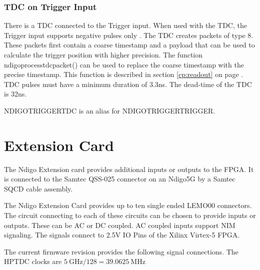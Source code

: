\subsubsection{TDC on Trigger Input}
%
There is a TDC connected to the Trigger input. When used with the TDC, the Trigger input supports negative pulses only . The TDC creates packets of type 8. These packets first contain a coarse timestamp and a payload that can be used to calculate the trigger position with higher precision. The function \textsf{ndigo\tu process\tu tdc\tu packet()} can be used to replace the coarse timestamp with the precise timestamp. This function is described in section \ref{cp:readout} on page \pageref{cp:readout}.
TDC pulses must have a minimum duration of 3.3ns. The dead-time of the TDC is 32ns.

\textsf{NDIGO\tu TRIGGER\tu TDC} is an alias for \textsf{NDIGO\tu TRIGGER\tu TRIGGER}.
%
%
%
%
%
\section{Extension Card\label{cp:extcard}}

The Ndigo Extension card provides additional inputs or outputs to the FPGA. It is connected to the Samtec QSS-025 connector on an Ndigo5G by a Samtec SQCD cable assembly.\par
The Ndigo Extension Card provides up to ten single ended LEMO00 connectors. The circuit connecting to each of these circuits can be chosen to provide inputs or outputs. These can be AC or DC coupled. AC coupled inputs support NIM signaling. The signals connect to 2.5V IO Pins of the Xilinx Virtex-5 FPGA.\par
The current firmware revision provides the following signal connections. The HPTDC clocks are $\SI{5}{\giga\hertz} / 128 = \SI{39.0625}{\mega\hertz}$\par


